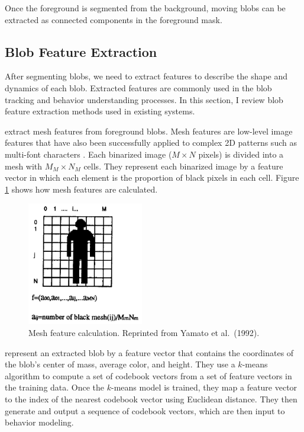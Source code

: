 Once the foreground is segmented from the background, moving blobs can
be extracted as connected components in the foreground mask.

\subsection{Blob Feature Extraction}

After segmenting blobs, we need to extract features to describe the
shape and dynamics of each blob. Extracted features are commonly used
in the blob tracking and behavior understanding processes.  In this
section, I review blob feature extraction methods used in existing
systems.

 extract mesh features from foreground
blobs. Mesh features are low-level image features that have also been
successfully applied to complex 2D patterns such as multi-font
characters . Each binarized image ($M \times N$
pixels) is divided into a mesh with $M_M \times N_M$ cells. They
represent each binarized image by a feature vector in which each
element is the proportion of black pixels in each
cell. Figure \ref{fig:mesh-feature} shows how mesh features are
calculated.

\begin{figure}[t]
  \centering
  \includegraphics[width=2in]{figures/mesh-feature.jpg}  
  \caption[Mesh feature calculation.]{\small Mesh feature
    calculation. Reprinted from Yamato et al.\ (1992).}
  \label{fig:mesh-feature}
\end{figure}

 represent an extracted blob by a
feature vector that contains the coordinates of the blob's center of
mass, average color, and height. They use a $k$-means algorithm to
compute a set of codebook vectors from a set of feature vectors in the
training data. Once the $k$-means model is trained, they map a feature
vector to the index of the nearest codebook vector using Euclidean
distance. They then generate and output a sequence of codebook
vectors, which are then input to behavior modeling.

